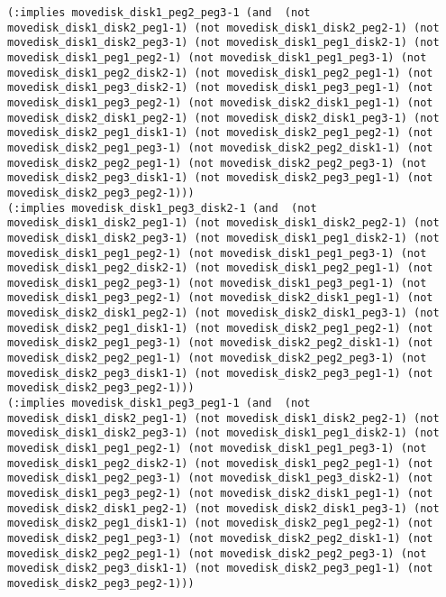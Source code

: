 \documentclass[12pt,letterpaper]{ntdhw}
\begin{document}
\begin{enumerate}
\begin{enumerate}
\begin{lstlisting}[language=pddl, style=pddlstyle,
  basicstyle=\scriptsize]
(:implies movedisk_disk1_peg2_peg3-1 (and  (not movedisk_disk1_disk2_peg1-1) (not movedisk_disk1_disk2_peg2-1) (not movedisk_disk1_disk2_peg3-1) (not movedisk_disk1_peg1_disk2-1) (not movedisk_disk1_peg1_peg2-1) (not movedisk_disk1_peg1_peg3-1) (not movedisk_disk1_peg2_disk2-1) (not movedisk_disk1_peg2_peg1-1) (not movedisk_disk1_peg3_disk2-1) (not movedisk_disk1_peg3_peg1-1) (not movedisk_disk1_peg3_peg2-1) (not movedisk_disk2_disk1_peg1-1) (not movedisk_disk2_disk1_peg2-1) (not movedisk_disk2_disk1_peg3-1) (not movedisk_disk2_peg1_disk1-1) (not movedisk_disk2_peg1_peg2-1) (not movedisk_disk2_peg1_peg3-1) (not movedisk_disk2_peg2_disk1-1) (not movedisk_disk2_peg2_peg1-1) (not movedisk_disk2_peg2_peg3-1) (not movedisk_disk2_peg3_disk1-1) (not movedisk_disk2_peg3_peg1-1) (not movedisk_disk2_peg3_peg2-1)))
(:implies movedisk_disk1_peg3_disk2-1 (and  (not movedisk_disk1_disk2_peg1-1) (not movedisk_disk1_disk2_peg2-1) (not movedisk_disk1_disk2_peg3-1) (not movedisk_disk1_peg1_disk2-1) (not movedisk_disk1_peg1_peg2-1) (not movedisk_disk1_peg1_peg3-1) (not movedisk_disk1_peg2_disk2-1) (not movedisk_disk1_peg2_peg1-1) (not movedisk_disk1_peg2_peg3-1) (not movedisk_disk1_peg3_peg1-1) (not movedisk_disk1_peg3_peg2-1) (not movedisk_disk2_disk1_peg1-1) (not movedisk_disk2_disk1_peg2-1) (not movedisk_disk2_disk1_peg3-1) (not movedisk_disk2_peg1_disk1-1) (not movedisk_disk2_peg1_peg2-1) (not movedisk_disk2_peg1_peg3-1) (not movedisk_disk2_peg2_disk1-1) (not movedisk_disk2_peg2_peg1-1) (not movedisk_disk2_peg2_peg3-1) (not movedisk_disk2_peg3_disk1-1) (not movedisk_disk2_peg3_peg1-1) (not movedisk_disk2_peg3_peg2-1)))
(:implies movedisk_disk1_peg3_peg1-1 (and  (not movedisk_disk1_disk2_peg1-1) (not movedisk_disk1_disk2_peg2-1) (not movedisk_disk1_disk2_peg3-1) (not movedisk_disk1_peg1_disk2-1) (not movedisk_disk1_peg1_peg2-1) (not movedisk_disk1_peg1_peg3-1) (not movedisk_disk1_peg2_disk2-1) (not movedisk_disk1_peg2_peg1-1) (not movedisk_disk1_peg2_peg3-1) (not movedisk_disk1_peg3_disk2-1) (not movedisk_disk1_peg3_peg2-1) (not movedisk_disk2_disk1_peg1-1) (not movedisk_disk2_disk1_peg2-1) (not movedisk_disk2_disk1_peg3-1) (not movedisk_disk2_peg1_disk1-1) (not movedisk_disk2_peg1_peg2-1) (not movedisk_disk2_peg1_peg3-1) (not movedisk_disk2_peg2_disk1-1) (not movedisk_disk2_peg2_peg1-1) (not movedisk_disk2_peg2_peg3-1) (not movedisk_disk2_peg3_disk1-1) (not movedisk_disk2_peg3_peg1-1) (not movedisk_disk2_peg3_peg2-1)))

\end{lstlisting}
\end{enumerate}
\end{enumerate}
\end{document}
